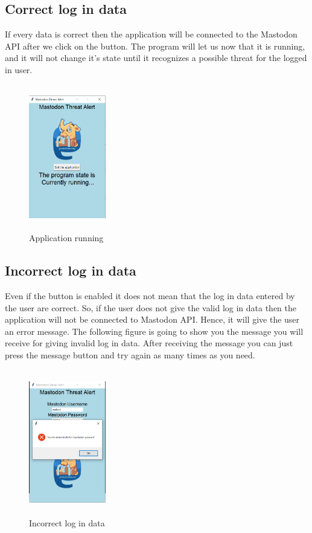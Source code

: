 \subsection{Correct log in data}
\label{ss:correct_data}
If every data is correct then the application will be connected to the Mastodon API after
we click on the button. The program will let us now that it is running, and it will not
change it's state until it recognizes a possible threat for the logged in user.
\begin{figure}[H]
	\centering
	\includegraphics[width=0.3\textwidth,height=240px]{images/runningapp.png}
	\caption{Application running}
	\label{fig:running_app}
\end{figure}

\subsection{Incorrect log in data}
\label{ss:incorrect_data}
Even if the button is enabled it does not mean that the log in data entered by the user
are correct. So, if the user does not give the valid log in data then the application 
will not be connected to Mastodon API. Hence, it will give the user an error message.
The following figure is going to show you the message you will receive for giving invalid 
log in data. After receiving the message you can just press the message button and try again
as many times as you need.
\begin{figure}[H]
	\centering
	\includegraphics[width=0.3\textwidth,height=240px]{images/invalidred.png}
	\caption{Incorrect log in data}
	\label{fig:invalid_data}
\end{figure}

